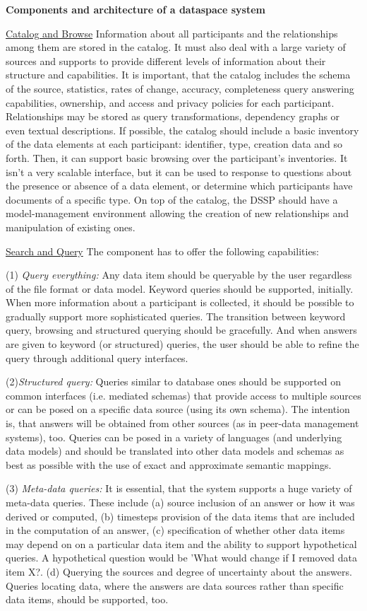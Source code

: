 \textbf{Components and architecture of a dataspace system}

\uline{Catalog and Browse} Information about all participants and the relationships among them are stored in the catalog. It must also deal with a large variety of sources and supports to provide different levels of information about their structure and capabilities. It is important, that the catalog includes the schema of the source, statistics, rates of change, accuracy, completeness query answering capabilities, ownership, and access and privacy policies for each participant. Relationships may be stored as query transformations, dependency graphs or even textual descriptions. If possible, the catalog should include a basic inventory of the data elements at each participant: identifier, type, creation data and so forth. Then, it can support basic browsing over the participant's inventories.
It isn't a very scalable interface, but it can be used to response to questions about the presence or absence of a data element, or determine which participants have documents of a specific type. 
On top of the catalog, the DSSP should have a model-management environment allowing the creation of new relationships and manipulation of existing ones.

\uline{Search and Query} The component has to offer the following capabilities:

(1) \emph{Query everything:} Any data item should be queryable  by the user regardless of the file format or data model. Keyword queries should be supported, initially. When more information about a participant is collected, it should be possible to gradually support more sophisticated queries. The transition between keyword query, browsing and structured querying should be gracefully. And when answers are given to keyword (or structured) queries, the user should be able to refine the query through additional query interfaces. 

(2)\emph{Structured query:} Queries similar to database ones should be supported on common interfaces (i.e. mediated schemas) that provide access to multiple sources or can be posed on a specific data source (using its own schema). The intention is, that answers will be obtained from other sources (as in peer-data management systems), too. Queries can be posed in a variety of languages (and underlying data models) and should be translated into other data models and schemas as best as possible with the use of exact and approximate semantic mappings.

(3) \emph{Meta-data queries:} It is essential, that the system supports a huge variety of meta-data queries. These include (a) source inclusion of an answer or how it was derived or computed, (b) timesteps provision of the data items that are included in the computation of an answer, (c) specification of whether other data items may depend on on a particular data item and the ability to support hypothetical queries. A hypothetical question would be 'What would change if I removed data item X?. (d) Querying the sources and degree of uncertainty about the answers.
Queries locating data, where the answers are data sources rather than specific data items, should be supported, too. 


